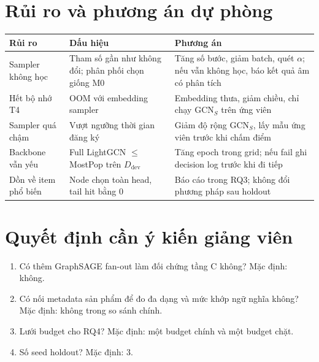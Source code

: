 \documentclass[11pt,a4paper]{article}
\begin{document}
\section{Rủi ro và phương án dự phòng}
\begin{center}\small
\begin{tabularx}{\linewidth}{lYY}
\toprule
Rủi ro & Dấu hiệu & Phương án \\
\midrule
Sampler không học & Tham số gần như không đổi; phân phối chọn giống M0 & Tăng số bước, giảm batch, quét $\alpha$; nếu vẫn không học, báo kết quả âm có phân tích \\
Hết bộ nhớ T4 & OOM với embedding sampler & Embedding thưa, giảm chiều, chỉ chạy $\mathrm{GCN}_S$ trên ứng viên \\
Sampler quá chậm & Vượt ngưỡng thời gian đăng ký & Giảm độ rộng $\mathrm{GCN}_S$, lấy mẫu ứng viên trước khi chấm điểm \\
Backbone vẫn yếu & Full LightGCN $\le$ MostPop trên $D_{\text{dev}}$ & Tăng epoch trong grid; nếu fail ghi decision log trước khi đi tiếp \\
Dồn về item phổ biến & Node chọn toàn head, tail hit bằng 0 & Báo cáo trong RQ3; không đổi phương pháp sau holdout \\
\bottomrule
\end{tabularx}
\end{center}

\section{Quyết định cần ý kiến giảng viên}
\begin{enumerate}[label=\textbf{OD-\arabic*:},leftmargin=1.6cm]
\item Có thêm GraphSAGE fan-out làm đối chứng tầng C không? Mặc định: không.
\item Có nối metadata sản phẩm để đo đa dạng và mức khớp ngữ nghĩa không? Mặc định: không trong so sánh chính.
\item Lưới budget cho RQ4? Mặc định: một budget chính và một budget chặt.
\item Số seed holdout? Mặc định: 3.
\end{enumerate}
\end{document}
